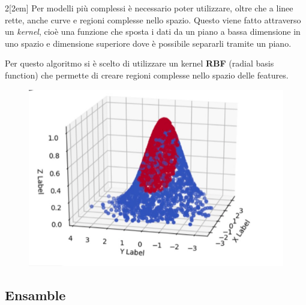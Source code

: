 \documentclass[12pt,a4paper]{article}
\begin{document}
\begin{multicols}{2}[\columnsep2em]
    Per modelli più complessi è necessario poter utilizzare, oltre che a linee rette, anche curve e regioni complesse nello spazio.
    Questo viene fatto attraverso un \textit{kernel}, cioè una funzione che sposta i dati da un piano a bassa dimensione in uno spazio e dimensione superiore dove è possibile separarli tramite un piano.

    Per questo algoritmo si è scelto di utilizzare un kernel \textbf{RBF} (radial basis function) che permette di creare regioni complesse nello spazio delle features.
    \columnbreak

    \begin{figure}[H]
        \centering
        \includegraphics[width=1\linewidth]{rbf.png}
        \caption{}
        \label{fig:my_label}
    \end{figure}
\end{multicols}


\subsection{Ensamble}
\end{document}
